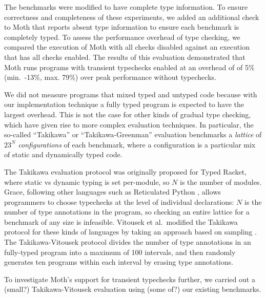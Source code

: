 \documentclass[sigplan,10pt,review,screen]{acmart}\settopmatter{printfolios=true}
\begin{document}
The benchmarks were modified to have complete type information.  To
ensure correctness and completeness of these experiments, we added an
additional check to Moth that reports absent type information to
ensure each benchmark is completely typed.  To assess the performance
overhead of type checking, we compared the execution of Moth with all
checks disabled against an execution that has all checks enabled.  The
results of this evaluation demonstrated that Moth runs programs with
transient typechecks enabled at an overhead of of 5\% (min.\ -13\%,
max. 79\%) over peak performance without typechecks.

We did not measure programs that mixed typed and untyped code because
with our implementation technique a fully typed program is expected to
have the largest overhead. This is not the case for other kinds of
gradual type checking, which have given rise to more complex
evaluation techniques.  In particular, the so-called ``Takikawa'' or
``Takikawa-Greenman'' evaluation \cite{Takikawa2016,Greenman2019jfp}
benchmarks a \emph{lattice} of $23^N$ \emph{configurations} of each
benchmark, where a configuration is a particular mix of static and
dynamically typed code.

The Takikawa evaluation protocol was originally proposed for Typed
Racket, where static vs dynamic typing is set per-module, so $N$ is
the number of modules. Grace, following other languages such as
Reticulated Python \cite{reticPython2014,monotonic2015,Vitousek2017},
allows programmers to choose typechecks at the level of individual
declarations: $N$ is the number of type annotations in the program,
so checking an entire lattice for a benchmark of any size
is infeasible.  Vitousek et al.\ modified the Takikawa protocol for
these kinds of languages by taking an approach based on sampling
\cite{vitousek-transient-arXive-2019}.  The Takikawa-Vitousek protocol
divides the number of type annotations in an fully-typed program into
a maximum of 100 intervals, and then randomly generates ten programs within
each interval by erasing type annotations.

To investigate Moth's support for transient typechecks further, we
carried out a (small?) Takikawa-Vitousek evaluation using (some of?)
our existing benchmarks.
\end{document}
